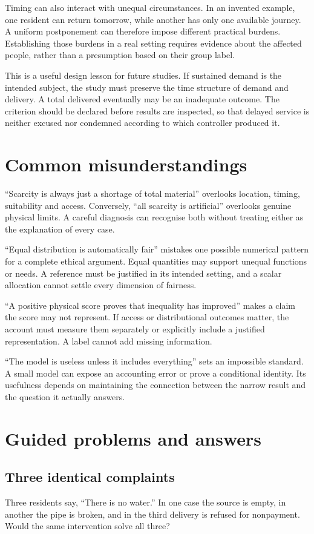 Timing can also interact with unequal circumstances. In an invented example, one resident can return tomorrow, while another has only one available journey. A uniform postponement can therefore impose different practical burdens. Establishing those burdens in a real setting requires evidence about the affected people, rather than a presumption based on their group label.

This is a useful design lesson for future studies. If sustained demand is the intended subject, the study must preserve the time structure of demand and delivery. A total delivered eventually may be an inadequate outcome. The criterion should be declared before results are inspected, so that delayed service is neither excused nor condemned according to which controller produced it.

\section{Common misunderstandings}
``Scarcity is always just a shortage of total material'' overlooks location, timing, suitability and access. Conversely, ``all scarcity is artificial'' overlooks genuine physical limits. A careful diagnosis can recognise both without treating either as the explanation of every case.

``Equal distribution is automatically fair'' mistakes one possible numerical pattern for a complete ethical argument. Equal quantities may support unequal functions or needs. A reference must be justified in its intended setting, and a scalar allocation cannot settle every dimension of fairness.

``A positive physical score proves that inequality has improved'' makes a claim the score may not represent. If access or distributional outcomes matter, the account must measure them separately or explicitly include a justified representation. A label cannot add missing information.

``The model is useless unless it includes everything'' sets an impossible standard. A small model can expose an accounting error or prove a conditional identity. Its usefulness depends on maintaining the connection between the narrow result and the question it actually answers.

\section{Guided problems and answers}
\subsection{Three identical complaints}
Three residents say, ``There is no water.'' In one case the source is empty, in another the pipe is broken, and in the third delivery is refused for nonpayment. Would the same intervention solve all three?

